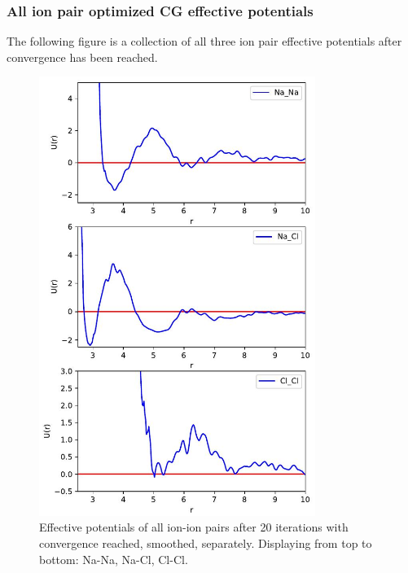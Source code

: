 \documentclass[10pt]{article}
\begin{document}
        \subsubsection{All ion pair optimized CG effective potentials}
        The following figure is a collection of all three ion pair effective potentials after convergence has been reached. 
            \begin{figure}[H]
                \centering
                \includegraphics[width = 0.8\textwidth]{All_pots_iter20_separate_a.jpg}
                \caption{Effective potentials of all ion-ion pairs after 20 iterations with convergence reached, smoothed, separately. Displaying from top to bottom: Na-Na, Na-Cl, Cl-Cl.}
                \label{fig:allpot_unproc_separate}
            \end{figure}

        
\end{document}
